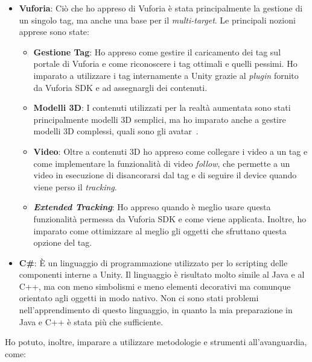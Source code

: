 \begin{itemize}
	\item \textbf{Vuforia}: Ci\`o che ho appreso di Vuforia \`e stata principalmente la gestione di un singolo tag, ma anche una base per il \textit{multi-target}. Le principali nozioni apprese sono state:
	\begin{itemize}
		\item \textbf{Gestione Tag}: Ho appreso come gestire il caricamento dei tag sul portale di Vuforia e come riconoscere i tag ottimali e quelli pessimi. Ho imparato a utilizzare i tag internamente a Unity grazie al \textit{plugin} fornito da Vuforia SDK e ad assegnargli dei contenuti.
		
		\item \textbf{Modelli 3D}: I contenuti utilizzati per la realt\`a aumentata sono stati principalmente modelli 3D semplici, ma ho imparato anche a gestire modelli 3D complessi, quali sono gli avatar\gloss\ .
		
		\item \textbf{Video}: Oltre a contenuti 3D ho appreso come collegare i video a un tag e come implementare la funzionalit\`a di video \textit{follow}, che permette a un video in esecuzione di disancorarsi dal tag e di seguire il device quando viene perso il \textit{tracking}.
		
		\item \textbf{\textit{Extended Tracking}}: Ho appreso quando \`e meglio usare questa funzionalit\`a permessa da Vuforia SDK e come viene applicata. Inoltre, ho imparato come ottimizzare al meglio gli oggetti che sfruttano questa opzione del tag.
	\end{itemize}
	
	\item \textbf{C\#}: \`E un linguaggio di programmazione utilizzato per lo scripting delle componenti interne a Unity. Il linguaggio \`e risultato molto simile al Java e al C++, ma con meno simbolismi e meno elementi decorativi ma comunque orientato agli oggetti in modo nativo. Non ci sono stati problemi nell'apprendimento di questo linguaggio, in quanto la mia preparazione in Java e C++ \`e stata pi\`u che sufficiente.
\end{itemize}
\noindent
Ho potuto, inoltre, imparare a utilizzare metodologie e strumenti all'avanguardia, come:

